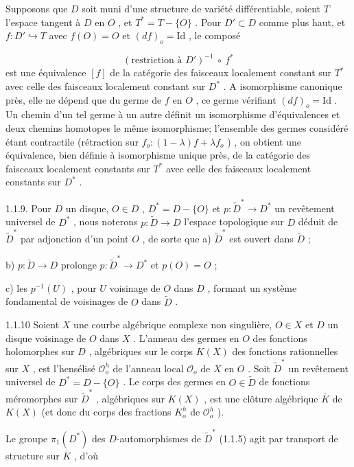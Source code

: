 Supposons que $D$ soit muni d'une structure de variété différentiable, soient $T$ l'espace tangent à $D$ en $O$ , et $T^{*} = T-\{O\}$ . Pour $D' \subset D$ comme plus haut, et $f : D' \hookrightarrow T$ avec $f(O) = O$ et $(df)_{o} = \mathrm{Id}$ , le composé

\begin{equation*}
(\text{restriction à } D')^{-1} \ \circ \ f^{*}
\end{equation*}
est une équivalence $[f]$ de la catégorie des faisceaux localement constant sur $T^{*}$ avec celle des faisceaux localement constant sur $D^{*}$ . A isomorphisme canonique près, elle ne dépend que du germe de $f$ en $O$ , ce germe vérifiant $(df)_{o} = \mathrm{Id}$ . Un chemin d'un tel germe à un autre définit un isomorphisme d'équivalences et deux chemins homotopes le même isomorphisme; l'ensemble des germes considéré étant contractile (rétraction sur $f_{o} : (1-\lambda)f + \lambda f_{o}$ ) , on obtient une équivalence, bien définie à isomorphisme unique près, de la catégorie des faisceaux localement constants sur $T^{*}$ avec celle des faisceaux localement constants sur $D^{*}$ .

1.1.9. Pour $D$ un disque, $O \in D$ , $D^{*} = D-\{O\}$ et $p : \tilde{D}^{*} \to D^{*}$ un revêtement universel de $D^{*}$ , nous noterons $p : \tilde{D} \to D$ l'espace topologique sur $D$ déduit de $\tilde{D}^{*}$ par adjonction d'un point $O$ , de sorte que
a) $\widetilde{D}^*$ est ouvert dans $\widetilde{D}$ ;

b) $p : \widetilde{D} \to D$ prolonge $p : \widetilde{D}^* \to D^*$ et $p(O) = O$ ;

c) les $p^{-1}(U)$ , pour $U$ voisinage de $O$ dans $D$ , formant un système fondamental de voisinages de $O$ dans $\widetilde{D}$ .

1.1.10 Soient $X$ une courbe algébrique complexe non singulière, $O \in X$ et $D$ un disque voisinage de $O$ dans $X$ . L'anneau des germes en $O$ des fonctions holomorphes sur $D$ , algébriques sur le corps $K(X)$ des fonctions rationnelles sur $X$ , est l'hensélisé $\mathcal{O}_o^h$ de l'anneau local $\mathcal{O}_o$ de $X$ en $O$ . Soit $\widetilde{D}^*$ un revêtement universel de $D^* = D-\{O\}$ . Le corps des germes en $O \in \widetilde{D}$ de fonctions méromorphes sur $\widetilde{D}^*$ , algébriques sur $K(X)$ , est une clôture algébrique $\overline{K}$ de $K(X)$ (et donc du corps des fractions $K_o^h$ de $\mathcal{O}_o^h$ ).

Le groupe $\pi_1(D^*)$ des $D$-automorphismes de $\widetilde{D}^*$ (1.1.5) agit par transport de structure sur $\overline{K}$ , d'où

